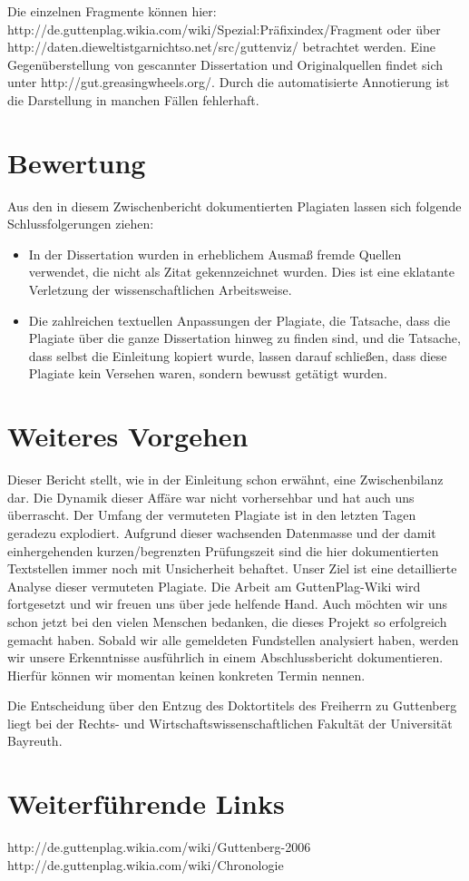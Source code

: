 \documentclass[ngerman,final,fontsize=12pt,paper=a4,twoside,BCOR=8mm,draft=false]{scrartcl}
\begin{document}
Die einzelnen Fragmente können hier: http://de.guttenplag.wikia.com/wiki/Spezial:Präfixindex/Fragment oder über http://daten.dieweltistgarnichtso.net/src/guttenviz/ betrachtet werden. Eine Gegenüberstellung von gescannter Dissertation und Originalquellen findet sich unter http://gut.greasingwheels.org/. Durch die automatisierte Annotierung ist die Darstellung in manchen Fällen fehlerhaft.

\section{Bewertung}
Aus den in diesem Zwischenbericht dokumentierten Plagiaten lassen sich folgende Schlussfolgerungen ziehen:
\begin{itemize}
\item In der Dissertation wurden in erheblichem Ausmaß fremde Quellen verwendet, die nicht als Zitat gekennzeichnet wurden. Dies ist eine eklatante Verletzung der wissenschaftlichen Arbeitsweise.
\item Die zahlreichen textuellen Anpassungen der Plagiate, die Tatsache, dass die Plagiate über die ganze Dissertation hinweg zu finden sind, und die Tatsache, dass selbst die Einleitung kopiert wurde, lassen darauf schließen, dass diese Plagiate kein Versehen waren, sondern bewusst getätigt wurden.
\end{itemize}
\section{Weiteres Vorgehen}
Dieser Bericht stellt, wie in der Einleitung schon erwähnt, eine Zwischenbilanz dar. Die Dynamik dieser Affäre war nicht vorhersehbar und hat auch uns überrascht. Der Umfang der vermuteten Plagiate ist in den letzten Tagen geradezu explodiert. Aufgrund dieser wachsenden Datenmasse und der damit einhergehenden kurzen/begrenzten Prüfungszeit sind die hier dokumentierten Textstellen immer noch mit Unsicherheit behaftet. Unser Ziel ist eine detaillierte Analyse dieser vermuteten Plagiate. Die Arbeit am GuttenPlag-Wiki wird fortgesetzt und wir freuen uns über jede helfende Hand. Auch möchten wir uns schon jetzt bei den vielen Menschen bedanken, die dieses Projekt so erfolgreich gemacht haben. Sobald wir alle gemeldeten Fundstellen analysiert haben, werden wir unsere Erkenntnisse ausführlich in einem Abschlussbericht dokumentieren. Hierfür können wir momentan keinen konkreten Termin nennen. 

Die Entscheidung über den Entzug des Doktortitels des Freiherrn zu Guttenberg liegt bei der Rechts- und Wirtschaftswissenschaftlichen Fakultät der Universität Bayreuth.

\section{Weiterführende Links}
http://de.guttenplag.wikia.com/wiki/Guttenberg-2006 
http://de.guttenplag.wikia.com/wiki/Chronologie
\end{document}
